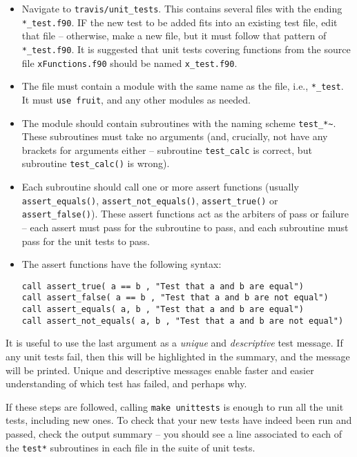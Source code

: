 \begin{itemize}
\item Navigate to \texttt{travis/unit\_tests}. This contains several
  files with the ending \texttt{*\_test.f90}. IF the new test to be
  added fits into an existing test file, edit that file -- otherwise,
  make a new file, but it must follow that pattern of
  \texttt{*\_test.f90}. It is suggested that unit tests covering
  functions from the source file \texttt{xFunctions.f90} should be
  named \texttt{x\_test.f90}.
\item The file must contain a module with the same name as the file,
  i.e., \texttt{*\_test}. It must \texttt{use\ fruit}, and any other
  modules as needed.
\item The module should contain subroutines with the naming scheme
  \texttt{test\_*\textasciitilde}. These subroutines must take no
  arguments (and, crucially, not have any brackets for arguments
  either -- subroutine \texttt{test\_calc} is correct, but subroutine
  \texttt{test\_calc()} is wrong).
\item Each subroutine should call one or more assert functions
  (usually \texttt{assert\_equals()}, \texttt{assert\_not\_equals()},
  \texttt{assert\_true()} or \texttt{assert\_false()}). These assert
  functions act as the arbiters of pass or failure -- each assert must
  pass for the subroutine to pass, and each subroutine must pass for
  the unit tests to pass.
\item The assert functions have the following syntax:

\begin{verbatim}
call assert_true( a == b , "Test that a and b are equal")
call assert_false( a == b , "Test that a and b are not equal")
call assert_equals( a, b , "Test that a and b are equal")
call assert_not_equals( a, b , "Test that a and b are not equal")
\end{verbatim}

\end{itemize}

It is useful to use the last argument as a \emph{unique} and
\emph{descriptive} test message. If any unit tests fail, then this
will be highlighted in the summary, and the message will be
printed. Unique and descriptive messages enable faster and easier
understanding of which test has failed, and perhaps why.

If these steps are followed, calling \texttt{make\ unittests} is
enough to run all the unit tests, including new ones. To check that
your new tests have indeed been run and passed, check the output
summary -- you should see a line associated to each of the
\texttt{test*} subroutines in each file in the suite of unit tests.

